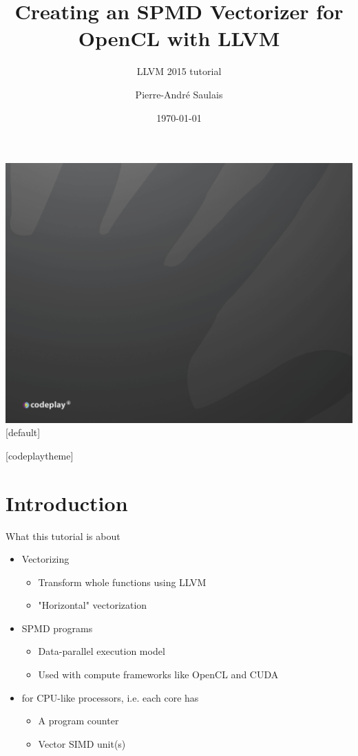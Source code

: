 \documentclass[t]{beamer}
\title{Creating an SPMD Vectorizer for OpenCL with LLVM}
\subtitle{LLVM 2015 tutorial}
\author{Pierre-André Saulais}
\institute{Codeplay Software \\ @codeplaysoft}
\date{\today}
\begin{document}
{\includegraphics[width=\paperwidth,height=\paperheight]{dark_background_title.png}}
[default]

\begin{frame}
  \vspace{4ex}
  \titlepage
\end{frame}


[codeplaytheme]

\section*{Introduction}

\begin{frame}{What this tutorial is about}

\begin{itemize}
    \item Vectorizing
    \begin{itemize}
        \item Transform whole functions using LLVM
        \item "Horizontal" vectorization
    \end{itemize}  
    \item SPMD programs
    \begin{itemize}
        \item Data-parallel execution model
        \item Used with compute frameworks like OpenCL and CUDA
    \end{itemize}
    \item for CPU-like processors, i.e. each core has
    \begin{itemize}
        \item A program counter
        \item Vector SIMD unit(s)
    \end{itemize}
\end{itemize}

\end{frame}
\end{document}
